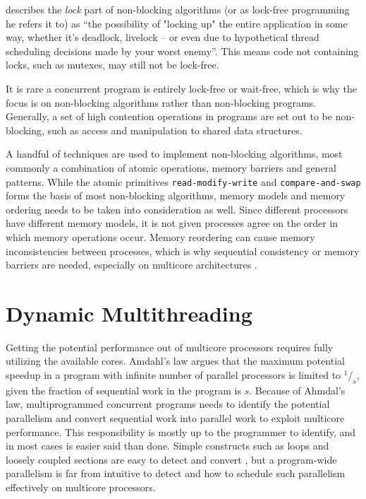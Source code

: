 \citet{preshing2012lockfree} describes the \textit{lock} part of non\hyp{}blocking algorithms (or as lock\hyp{}free programming he refers it to) as ``the possibility of "locking up" the entire application in some way, wheth\-er it's deadlock, livelock -- or even due to hypothetical thread scheduling decisions made by your worst enemy''. This means code not containing locks, such as mutexes, may still not be lock\hyp{}free. 

It is rare a concurrent program is entirely lock\hyp{}free or wait\hyp{}free, which is why the focus is on non\hyp{}blocking algorithms rather than non\hyp{}blocking programs. Generally, a set of high contention operations in programs are set out to be non\hyp{}blocking, such as access and manipulation to shared data structures.

A handful of techniques are used to implement non\hyp{}blocking algorithms, most commonly a combination of atomic operations, memory barriers and general patterns. While the atomic primitives \texttt{read\hyp{}modify\hyp{}write} and \texttt{compare\hyp{}and\hyp{}swap} forms the basis of most non\hyp{}blocking algorithms, memory models and memory ordering needs to be taken into consideration as well. Since different processors have different memory models, it is not given processes agree on the order in which memory operations occur. Memory reordering can cause memory inconsistencies between processes, which is why sequential consistency or memory barriers are needed, especially on multicore architectures \citep{preshing2012weakstrong,preshing2012barriers,preshing2012lockfree,preshing2012acquire}.


\section{Dynamic Multithreading}
\label{sec:dynamic_multithreading}

Getting the potential performance out of multicore processors requires fully utilizing the available cores. Amdahl's law \citep{amdahl1967validity} argues that the maximum potential speedup in a program with infinite number of parallel processors is limited to $^1/_s$, given the fraction of sequential work in the program is $s$. Because of Ahmdal's law, multiprogrammed concurrent programs needs to identify the potential parallelism and convert sequential work into parallel work to exploit multicore performance. This responsibility is mostly up to the programmer to identify, and in most cases is easier said than done. Simple constructs such as loops and loosely coupled sections are easy to detect and convert \citep{dagum1998openmp,robison2013composable}, but a program\hyp{}wide parallelism is far from intuitive to detect and how to schedule such parallelism effectively on multicore processors. 

